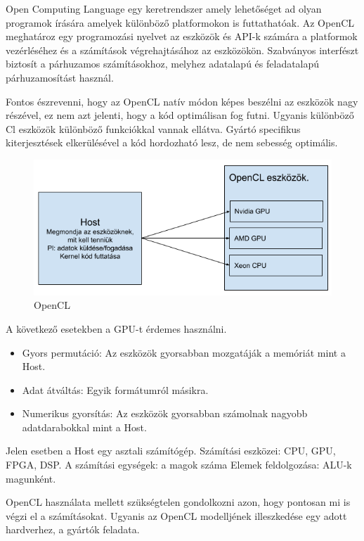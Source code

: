 

Open Computing Language egy keretrendszer amely lehetőséget ad olyan programok írására amelyek különböző platformokon is futtathatóak.
Az OpenCL meghatároz egy programozási nyelvet az eszközök és API-k számára a platformok vezérléséhez és a számítások végrehajtásához az eszközökön. Szabványos interfészt biztosít a párhuzamos számításokhoz, melyhez adatalapú és feladatalapú párhuzamosítást használ.

Fontos észrevenni, hogy az OpenCL natív módon képes beszélni az eszközök nagy részével, ez nem azt jelenti, hogy a kód optimálisan fog futni. Ugyanis különböző Cl eszközök különböző funkciókkal vannak ellátva. Gyártó specifikus kiterjesztések elkerülésével a kód hordozható lesz, de nem sebesség optimális.

\begin{figure}[h!]
\centering
\includegraphics[width=\textwidth]{images/opencl.png}
\caption{OpenCL}
\label{fig:opencl}
\end{figure}

A következő esetekben a GPU-t érdemes használni.
\begin{itemize}
\item Gyors permutáció: Az eszközök gyorsabban mozgatáják a memóriát mint a Host.
\item Adat átváltás: Egyik formátumról másikra.
\item Numerikus gyorsítás: Az eszközök gyorsabban számolnak nagyobb adatdarabokkal mint a Host.
\end{itemize}
Jelen esetben a Host egy asztali számítógép.
Számítási eszközei: CPU, GPU, FPGA, DSP.
A számítási egységek: a magok száma
Elemek feldolgozása: ALU-k magunként.

OpenCL használata mellett szükségtelen gondolkozni azon, hogy pontosan mi is végzi el a számításokat. Ugyanis az OpenCL modelljének illeszkedése egy adott hardverhez, a gyártók feladata.


